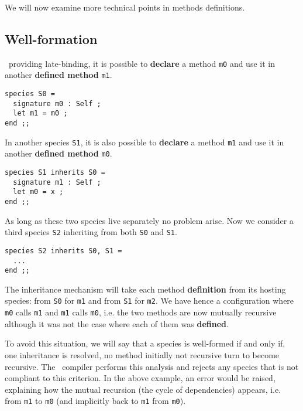


We will now examine more technical points in methods definitions.



\subsection{Well-formation}
\focal\ providing late-binding, it is possible to {\bf declare} a
method {\tt m0} and use it in another {\bf defined method} {\tt m1}.

{\scriptsize
\begin{lstlisting}
species S0 =
  signature m0 : Self ;
  let m1 = m0 ;
end ;;
\end{lstlisting}
}

In another species {\tt S1}, it is also possible to {\bf declare} a
method {\tt m1} and use it in another {\bf defined method} {\tt m0}.
{\scriptsize
\begin{lstlisting}
species S1 inherits S0 =
  signature m1 : Self ;
  let m0 = x ;
end ;;
\end{lstlisting}
}

As long as these two species live separately no problem arise. Now we
consider a third species {\tt S2} inheriting from both {\tt S0} and
{\tt S1}.
{\scriptsize
\begin{lstlisting}
species S2 inherits S0, S1 =
  ...
end ;;
\end{lstlisting}
}

The inheritance mechanism will take each method {\bf definition} from
its hosting species: from {\tt S0} for {\tt m1} and from {\tt S1} for
{\tt m2}. We have hence a configuration where {\tt m0} calls {\tt m1}
and {\tt m1} calls {\tt m0}, i.e. the two methods are now mutually
recursive although it was not the case where each of them was
{\bf defined}.

To avoid this situation, we will say that a species is well-formed if
and only if, one inheritance is resolved, no method initially not
recursive turn to become recursive. The \focal\ compiler performs this
analysis and rejects any species that is not compliant to this
criterion. In the above example, an error would be raised, explaining
how the mutual recursion (the cycle of dependencies) appears,
i.e. from {\tt m1} to {\tt m0} (and implicitly back to {\tt m1} from
{\tt m0}).

